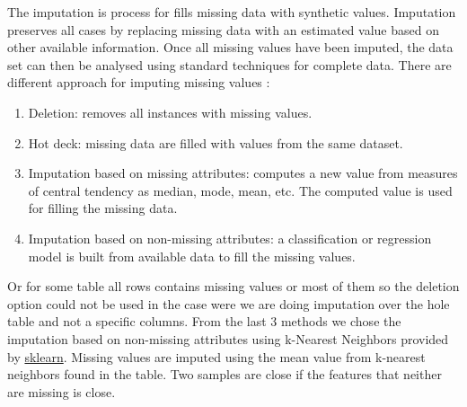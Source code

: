 \documentclass{article}
\begin{document}
\noindent
The imputation is process for fills missing data with synthetic values.
Imputation preserves all cases by replacing missing data with an estimated value based on other available information.
Once all missing values have been imputed, the data set can then be analysed using standard techniques for complete data.
There are different approach for imputing missing values \cite{corr_lede}:
\begin{enumerate}
    \item Deletion: removes all instances with missing values.
    \item Hot deck: missing data are filled with values from the same dataset.
    \item Imputation based on missing attributes: computes a new value from measures of central tendency as median, mode, mean,
          etc. The computed value is used for filling the missing data.
    \item Imputation based on non-missing attributes: a classification or regression model is built from available data to fill the missing values.
\end{enumerate}
Or for some table all rows contains missing values or most of them so the deletion option could not be used in the case were we are doing imputation over the hole table and not a specific columns.
From the last 3 methods we chose the imputation based on non-missing attributes using k-Nearest Neighbors provided by \href{https://scikit-learn.org/stable/modules/generated/sklearn.impute.KNNImputer.html}{sklearn}.
Missing values are imputed using the mean value from k-nearest neighbors found in the table. Two samples are close if the features that neither are missing is close.
\end{document}
